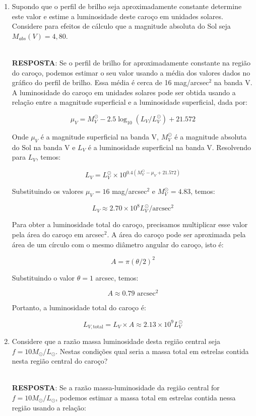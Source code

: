 \documentclass[a4paper,12pt]{article}
\begin{document}
\begin{enumerate}
\begin{enumerate}
\noindent\hrulefill

\item Supondo que o perfil de brilho seja aproximadamente constante determine este valor e estime a luminosidade deste caroço em unidades solares. Considere para efeitos de cálculo que a magnitude absoluta do Sol seja $M_{abs}(V) = 4,80$.

\noindent\hrulefill\\\textbf{RESPOSTA}: Se o perfil de brilho for aproximadamente constante na região do caroço, podemos estimar o seu valor usando a média dos valores dados no gráfico do perfil de brilho. Essa média é cerca de 16 mag/arcsec$^2$ na banda V. A luminosidade do caroço em unidades solares pode ser obtida usando a relação entre a magnitude superficial e a luminosidade superficial, dada por:

$$
\mu_V = M_V^\odot - 2.5 \log_{10} (L_V/L_V^\odot) + 21.572
$$

Onde $\mu_V$ é a magnitude superficial na banda V, $M_V^\odot$ é a magnitude absoluta do Sol na banda V e $L_V$ é a luminosidade superficial na banda V. Resolvendo para $L_V$, temos:

$$
L_V = L_V^\odot \times 10^{0.4 (M_V^\odot - \mu_V + 21.572)}
$$

Substituindo os valores $\mu_V = 16$ mag/arcsec$^2$ e $M_V^\odot = 4.83$, temos:

$$
L_V \approx 2.70 \times 10^8 L_V^\odot/\text{arcsec}^2
$$

Para obter a luminosidade total do caroço, precisamos multiplicar esse valor pela área do caroço em arcsec$^2$. A área do caroço pode ser aproximada pela área de um círculo com o mesmo diâmetro angular do caroço, isto é:

$$
A = \pi (\theta/2)^2
$$

Substituindo o valor $\theta = 1$ arcsec, temos:

$$
A \approx 0.79 \text{ arcsec}^2
$$

Portanto, a luminosidade total do caroço é:

$$
L_{V,\text{total}} = L_V \times A \approx 2.13 \times 10^9 L_V^\odot
$$

\noindent\hrulefill

\item Considere que a razão massa luminosidade desta região central seja $f = 10M_{\odot}/L_{\odot}$. Nestas condições qual seria a massa total em estrelas contida nesta região central do caroço?

\noindent\hrulefill\\\textbf{RESPOSTA}: Se a razão massa-luminosidade da região central for $f=10 M_\odot/L_\odot$, podemos estimar a massa total em estrelas contida nessa região usando a relação:


\end{enumerate}
\end{enumerate}
\end{document}
